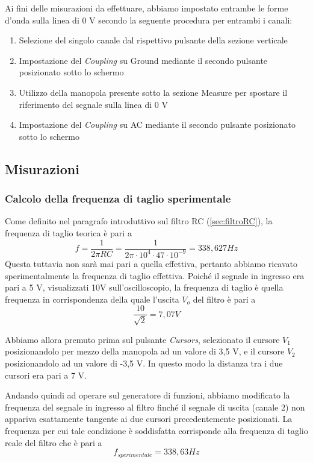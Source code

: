 \begin{itemize}
    Ai fini delle misurazioni da effettuare, abbiamo impostato entrambe le forme d'onda sulla linea di 0 V secondo la seguente procedura per entrambi i canali:
    \begin{enumerate}
        \item Selezione del singolo canale dal rispettivo pulsante della sezione verticale
        \item Impostazione del \emph{Coupling} su Ground mediante il secondo pulsante posizionato sotto lo schermo
        \item Utilizzo della manopola presente sotto la sezione Measure per spostare il riferimento del segnale sulla linea di 0 V
        \item Impostazione del \emph{Coupling} su AC mediante il secondo pulsante posizionato sotto lo schermo  
    \end{enumerate}
\end{itemize}

\clearpage


\subsection{Misurazioni}

\subsubsection{Calcolo della frequenza di taglio sperimentale}

Come definito nel paragrafo introduttivo sul filtro RC (\ref{sec:filtroRC}), la frequenza di taglio teorica è pari a
\[f=\frac{1}{2\pi RC}= \frac{1}{2\pi \cdot10^4 \cdot 47 \cdot10^{-9}} = 338,627 Hz\]
Questa tuttavia non sarà mai pari a quella effettiva, pertanto abbiamo ricavato sperimentalmente la frequenza di taglio effettiva. Poiché il segnale in ingresso era pari a 5 V, visualizzati 10V sull'oscilloscopio, la frequenza di taglio è quella frequenza in corrispondenza della quale l'uscita $V_{o}$ del filtro è pari a 
\[\frac{10}{\sqrt{2}} = 7,07 V\]

Abbiamo allora premuto prima sul pulsante \emph{Cursors}, selezionato il cursore $V_1$ posizionandolo per mezzo della manopola ad un valore di 3,5 V, 
e il cursore $V_2$ posizionandolo ad un valore di -3,5 V. In questo modo la distanza tra i due cursori era pari a 7 V.

Andando quindi ad operare sul generatore di funzioni, abbiamo modificato la frequenza del segnale in ingresso al filtro finché il segnale di uscita (canale 2) non appariva esattamente tangente ai due cursori precedentemente posizionati.
La frequenza per cui tale condizione è soddisfatta corrisponde alla frequenza di taglio reale del filtro che è pari a 
\[f_{sperimentale} = 338,63Hz\]

